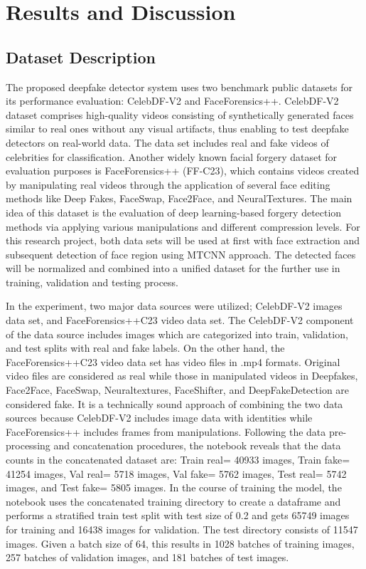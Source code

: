 \documentclass[conference]{IEEEtran}
\begin{document}
\section{Results and Discussion}

\subsection{Dataset Description}

The proposed deepfake detector system uses two benchmark public datasets for its performance evaluation: CelebDF-V2 and FaceForensics++. CelebDF-V2 dataset comprises high-quality videos consisting of synthetically generated faces similar to real ones without any visual artifacts, thus enabling to test deepfake detectors on real-world data. The data set includes real and fake videos of celebrities for classification. Another widely known facial forgery dataset for evaluation purposes is FaceForensics++ (FF-C23), which contains videos created by manipulating real videos through the application of several face editing methods like Deep Fakes, FaceSwap, Face2Face, and NeuralTextures. The main idea of this dataset is the evaluation of deep learning-based forgery detection methods via applying various manipulations and different compression levels. For this research project, both data sets will be used at first with face extraction and subsequent detection of face region using MTCNN approach. The detected faces will be normalized and combined into a unified dataset for the further use in training, validation and testing process.

In the experiment, two major data sources were utilized; CelebDF-V2 images data set, and FaceForensics++C23 video data set. The CelebDF-V2 component of the data source includes images which are categorized into train, validation, and test splits with real and fake labels. On the other hand, the FaceForensics++C23 video data set has video files in .mp4 formats. Original video files are considered as real while those in manipulated videos in Deepfakes, Face2Face, FaceSwap, Neuraltextures, FaceShifter, and DeepFakeDetection are considered fake. It is a technically sound approach of combining the two data sources because CelebDF-V2 includes image data with identities while FaceForensics++ includes frames from manipulations. 
Following the data pre-processing and concatenation procedures, the notebook reveals that the data counts in the concatenated dataset are: Train real= 40933 images, Train fake= 41254 images, Val real= 5718 images, Val fake= 5762 images, Test real= 5742 images, and Test fake= 5805 images. In the course of training the model, the notebook uses the concatenated training directory to create a dataframe and performs a stratified train test split with test size of 0.2 and gets 65749 images for training and 16438 images for validation. The test directory consists of 11547 images. Given a batch size of 64, this results in 1028 batches of training images, 257 batches of validation images, and 181 batches of test images.
\end{document}
